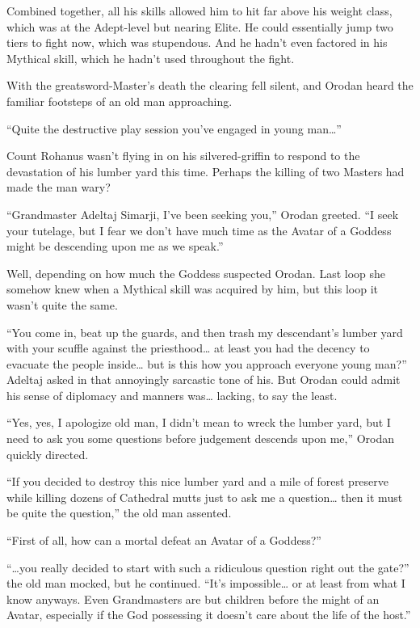 \documentclass[a4paper,10pt]{book}
\begin{document}
Combined together, all his skills allowed him to hit far above his weight class, which was at the Adept-level but nearing Elite. He could essentially jump two tiers to fight now, which was stupendous. And he hadn’t even factored in his Mythical skill, which he hadn’t used throughout the fight.\par
With the greatsword-Master’s death the clearing fell silent, and Orodan heard the familiar footsteps of an old man approaching.\par
“Quite the destructive play session you’ve engaged in young man…”\par
Count Rohanus wasn’t flying in on his silvered-griffin to respond to the devastation of his lumber yard this time. Perhaps the killing of two Masters had made the man wary?\par
“Grandmaster Adeltaj Simarji, I’ve been seeking you,” Orodan greeted. “I seek your tutelage, but I fear we don’t have much time as the Avatar of a Goddess might be descending upon me as we speak.”\par
Well, depending on how much the Goddess suspected Orodan. Last loop she somehow knew when a Mythical skill was acquired by him, but this loop it wasn’t quite the same.\par
“You come in, beat up the guards, and then trash my descendant’s lumber yard with your scuffle against the priesthood… at least you had the decency to evacuate the people inside… but is this how you approach everyone young man?” Adeltaj asked in that annoyingly sarcastic tone of his. But Orodan could admit his sense of diplomacy and manners was… lacking, to say the least.\par
“Yes, yes, I apologize old man, I didn’t mean to wreck the lumber yard, but I need to ask you some questions before judgement descends upon me,” Orodan quickly directed.\par
“If you decided to destroy this nice lumber yard and a mile of forest preserve while killing dozens of Cathedral mutts just to ask me a question… then it must be quite the question,” the old man assented.\par
“First of all, how can a mortal defeat an Avatar of a Goddess?”\par
“…you really decided to start with such a ridiculous question right out the gate?” the old man mocked, but he continued. “It’s impossible… or at least from what I know anyways. Even Grandmasters are but children before the might of an Avatar, especially if the God possessing it doesn’t care about the life of the host.”\par
\end{document}

